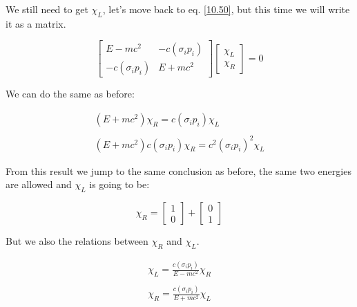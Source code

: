 We still need to get $\chi_L$, let's move back to eq. \ref{10.50}, but this time we will write it as a matrix.

\begin{equation}
\begin{bmatrix}
  E-mc^2 & -c(\sigma_i p_i)\\
  -c(\sigma_i p_i) & E+mc^2
\end{bmatrix}
\begin{bmatrix}
  \chi_L\\
  \chi_R
\end{bmatrix} = 0
\end{equation}


We can do the same as before:

\begin{equation}
  \begin{array}{c}
   (E+mc^2)\chi_R = c(\sigma_i p_i)\chi_L
    \\

    \\
    (E+mc^2)c(\sigma_i p_i) \chi_R = c^2(\sigma_i p_i)^2\chi_L
  \end{array}
\end{equation}

From this result we jump to the same conclusion as before, the same two energies are allowed and $\chi_L$ is going to be:

\begin{equation}
  \chi_R = \begin{bmatrix}
    1\\
    0
  \end{bmatrix} + \begin{bmatrix}
    0\\
    1
  \end{bmatrix}
\end{equation}

But we also the relations between $\chi_R$ and $\chi_L$.

\begin{equation}
  \begin{array}{c}
    \chi_L = \frac{c(\sigma_i p_i)}{E-mc^2}\chi_R
    \\

    \\
    \chi_R = \frac{c(\sigma_i p_i)}{E+mc^2}\chi_L
  \end{array}
\end{equation}

